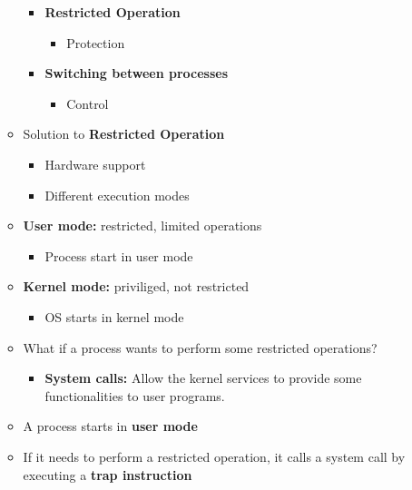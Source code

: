 \documentclass[a4paper,11pt,english]{article}
\begin{document}
\begin{itemize}
\begin{itemize}
                \begin{itemize}
                    \item \textbf{\color{red}Restricted Operation}
                        \begin{itemize}
                            \item Protection 
                        \end{itemize}
                    \item \textbf{\color{red}Switching between processes}
                        \begin{itemize}
                            \item Control 
                        \end{itemize}
                \end{itemize}
            \item Solution to \textbf{\color{red}Restricted Operation}
                \begin{itemize}
                    \item Hardware support
                    \item Different execution modes
                \end{itemize}
            \item \textbf{\color{blue}User mode:} restricted, limited operations
                \begin{itemize}
                    \item Process start in user mode
                \end{itemize}
            \item \textbf{\color{red}Kernel mode:} priviliged, not restricted
                \begin{itemize}
                    \item OS starts in kernel mode
                \end{itemize}
            \item What if a process wants to perform some restricted operations?
                \begin{itemize}
                    \item \textbf{\color{blue}System calls:} Allow the kernel services to provide some functionalities to user programs.
                \end{itemize}
            \item A process starts in \textbf{\color{blue}user mode}
            \item If it needs to perform a restricted operation, it calls a system call by executing a \textbf{\color{blue}trap instruction}

\end{itemize}
\end{itemize}
\end{document}
